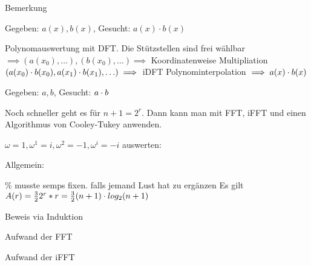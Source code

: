 \documentclass{../tudscript}
\begin{document}
Bemerkung


Gegeben: $a(x), b(x)$, Gesucht: $a(x)\cdot b(x)$


Polynomauswertung mit DFT. Die Stützstellen sind frei wählbar $\implies (a(x_0), \ldots), (b(x_0), \ldots) \implies$ Koordinatenweise Multipliation
$(a(x_0) \cdot b(x_0), a(x_1) \cdot b(x_1), \ldots) \implies$ iDFT Polynominterpolation $\implies a(x) \cdot b(x)$


Gegeben: $a, b$, Gesucht: $a\cdot b$


Noch schneller geht es für $n + 1 = 2^r$. Dann kann man mit FFT, iFFT und einen Algorithmus von Cooley-Tukey anwenden.

$\omega = 1, \omega^1 = i, \omega^2 = -1, \omega^i = -i$ auswerten:


Allgemein:


\% musste semps fixen. falls jemand Lust hat zu ergänzen
Es gilt $A(r) = \frac{3}{2} 2^r * r = \frac{3}{2} (n+1) \cdot log_2(n+1)$

Beweis via Induktion

Aufwand der FFT

Aufwand der iFFT
\end{document}
